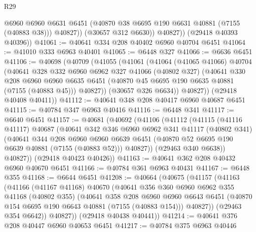 \begin{lexlean}{R29}
\begin{coremodule}
                @6960
                @6960
                @6631
                @6451
                (@40870 @38 @6695 @190 @6631 @40881 (@7155 (@40883 @38)))
                @40827))
            (@30657 @312 @6630))
          @40827))
      (@29418 @40393 @40396))
@41061 := @40641 @334 @208 @40402 @6960 @40704 @6451
@41064 := @41010 @333 @6963 @40401
@41065 := @6448 @327
@41066 := @6636 @6451
@41106 := @40698
    (@40709
      (@41055
        (@41061
          (@41064
            (@41065 @41066)
            @40704
            (@40641
              @328
              @332
              @6960
              @6962
              @327
              @41066
              (@40802 @327)
              (@40641
                @330
                @208
                @6960
                @6960
                @6635
                @6451
                (@40870 @45 @6695 @190 @6635 @40881 (@7155 (@40883 @45)))
                @40827))
            (@30657 @326 @6634))
          @40827))
      (@29418 @40408 @40411))
@41112 := @40641 @348 @208 @40417 @6960 @40687 @6451
@41115 := @40784 @347 @6963 @40416
@41116 := @6448 @341
@41117 := @6640 @6451
@41157 := @40681
    (@40692
      (@41106
        (@41112
          (@41115
            (@41116 @41117)
            @40687
            (@40641
              @342
              @346
              @6960
              @6962
              @341
              @41117
              (@40802 @341)
              (@40641
                @344
                @208
                @6960
                @6960
                @6639
                @6451
                (@40870 @52 @6695 @190 @6639 @40881 (@7155 (@40883 @52)))
                @40827))
            (@29463 @340 @6638))
          @40827))
      (@29418 @40423 @40426))
@41163 := @40641 @362 @208 @40432 @6960 @40670 @6451
@41166 := @40784 @361 @6963 @40431
@41167 := @6448 @355
@41168 := @6644 @6451
@41208 := @40664
    (@40675
      (@41157
        (@41163
          (@41166
            (@41167 @41168)
            @40670
            (@40641
              @356
              @360
              @6960
              @6962
              @355
              @41168
              (@40802 @355)
              (@40641
                @358
                @208
                @6960
                @6960
                @6643
                @6451
                (@40870 @154 @6695 @190 @6643 @40881 (@7155 (@40883 @154)))
                @40827))
            (@29463 @354 @6642))
          @40827))
      (@29418 @40438 @40441))
@41214 := @40641 @376 @208 @40447 @6960 @40653 @6451
@41217 := @40784 @375 @6963 @40446

\end{coremodule}
\end{lexlean}
